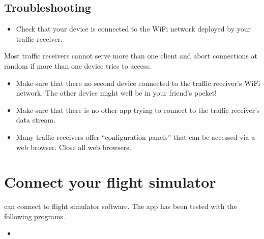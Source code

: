 \documentclass[letterpaper,10pt,english]{sphinxmanual}
\begin{document}
\section{Troubleshooting}
\label{\detokenize{02-steps/traffic:troubleshooting}}
\sphinxAtStartPar
{}
\begin{itemize}
\item {} 
\sphinxAtStartPar
Check that your device is connected to the Wi\sphinxhyphen{}Fi network deployed by your
traffic receiver.

\end{itemize}

\sphinxAtStartPar
{}

\sphinxAtStartPar
Most traffic receivers cannot serve more than one client and abort connections
at random if more than one device tries to access.
\begin{itemize}
\item {} 
\sphinxAtStartPar
Make sure that there no second device connected to the traffic receiver’s
Wi\sphinxhyphen{}Fi network. The other device might well be in your friend’s pocket!

\item {} 
\sphinxAtStartPar
Make sure that there is no other app trying to connect to the traffic
receiver’s data stream.

\item {} 
\sphinxAtStartPar
Many traffic receivers offer “configuration panels” that can be accessed via a
web browser. Close all web browsers.

\end{itemize}


\chapter{Connect your flight simulator}
\label{\detokenize{02-steps/simulator:connect-your-flight-simulator}}\label{\detokenize{02-steps/simulator::doc}}
\sphinxAtStartPar
{} can connect to flight simulator software.  The app
has been tested with the following programs.
\begin{itemize}
\item {} 
\sphinxAtStartPar
{}%
\begin{footnote}[13]\sphinxAtStartFootnote
{}
%
\end{footnote}

\end{itemize}
\end{document}
